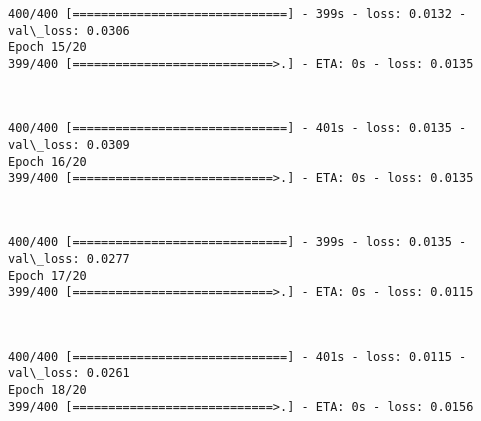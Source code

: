 \documentclass[11pt]{article}
\begin{document}
    \begin{Verbatim}[commandchars=\\\{\}]
400/400 [==============================] - 399s - loss: 0.0132 - val\_loss: 0.0306
Epoch 15/20
399/400 [============================>.] - ETA: 0s - loss: 0.0135
    \end{Verbatim}

    \begin{center}
    \end{center}
    { \hspace*{\fill} \\}
    
    \begin{Verbatim}[commandchars=\\\{\}]
400/400 [==============================] - 401s - loss: 0.0135 - val\_loss: 0.0309
Epoch 16/20
399/400 [============================>.] - ETA: 0s - loss: 0.0135
    \end{Verbatim}

    \begin{center}
    \end{center}
    { \hspace*{\fill} \\}
    
    \begin{Verbatim}[commandchars=\\\{\}]
400/400 [==============================] - 399s - loss: 0.0135 - val\_loss: 0.0277
Epoch 17/20
399/400 [============================>.] - ETA: 0s - loss: 0.0115
    \end{Verbatim}

    \begin{center}
    \end{center}
    { \hspace*{\fill} \\}
    
    \begin{Verbatim}[commandchars=\\\{\}]
400/400 [==============================] - 401s - loss: 0.0115 - val\_loss: 0.0261
Epoch 18/20
399/400 [============================>.] - ETA: 0s - loss: 0.0156
    \end{Verbatim}

    \begin{center}
    \end{center}
    { \hspace*{\fill} \\}
    
\end{document}
